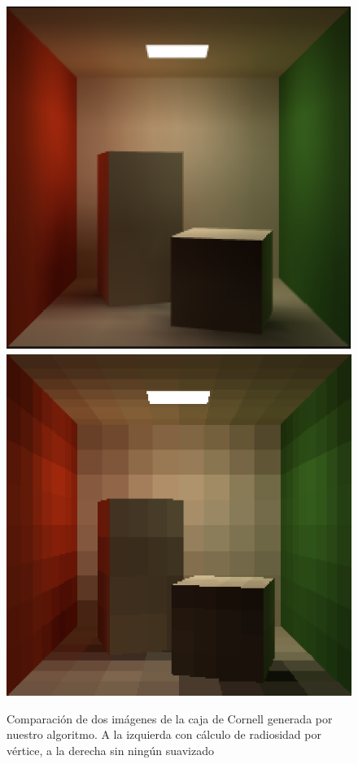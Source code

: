 \documentclass[letterpaper]{article}
\begin{document}
\begin{figure}[htbp]
  \centering
  \includegraphics{img/smooth}
  \hspace{2em}
  \includegraphics{img/nosmooth}
  \caption{Comparación de dos imágenes de la caja de Cornell generada
    por nuestro algoritmo. A la izquierda con cálculo de radiosidad
    por vértice, a la derecha sin ningún suavizado}
  \label{fig:smooth}
\end{figure}
\end{document}
